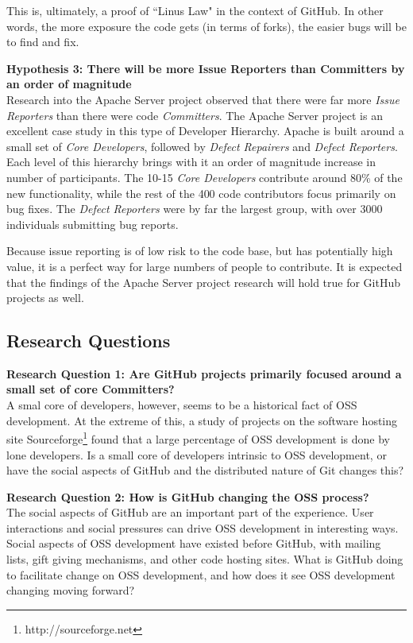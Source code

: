 \documentclass{proc}
\begin{document}
This is, ultimately, a proof of ``Linus Law"\cite{raymond1999cathedral} in the context of GitHub. In other words, the more exposure the code gets (in terms of forks), the easier bugs will be to find and fix.

\noindent \textbf{Hypothesis 3: There will be more Issue Reporters than Committers by an order of magnitude}\\
Research into the Apache Server project observed that there were far more \emph{Issue Reporters} than there were code \emph{Committers}\cite{mockus2000case}. The Apache Server project is an excellent case study in this type of Developer Hierarchy. Apache is built around a small set of {\it Core Developers}, followed by {\it Defect Repairers} and {\it Defect Reporters}. Each level of this hierarchy brings with it an order of magnitude increase in number of participants. The 10-15 {\it Core Developers} contribute around 80\% of the new functionality, while the rest of the 400 code contributors focus primarily on bug fixes. The {\it Defect Reporters} were by far the largest group, with over 3000 individuals submitting bug reports.

Because issue reporting is of low risk to the code base, but has potentially high value, it is a perfect way for large numbers of people to contribute. It is expected that the findings of the Apache Server project research will hold true for GitHub projects as well.

\subsection{Research Questions}

\noindent \textbf{Research Question 1: Are GitHub projects primarily focused around a small set of core Committers?}\\
A smal core of developers, however, seems to be a historical fact of OSS development\cite{mockus2000case,mockus2002two,krishnamurthy2002cave}. At the extreme of this, a study of projects on the software hosting site Sourceforge\footnote{http://sourceforge.net} found that a large percentage of OSS development is done by lone developers. Is a small core of developers intrinsic to OSS development, or have the social aspects of GitHub and the distributed nature of Git changes this?

\noindent \textbf{Research Question 2: How is GitHub changing the OSS process?}\\
The social aspects of GitHub are an important part of the experience\cite{dabbish2012social}. User interactions and social pressures can drive OSS development in interesting ways. Social aspects of OSS development have existed before GitHub, with mailing lists\cite{mockus2000case}, gift giving mechanisms\cite{bergquist2008power}, and other code hosting sites. What is GitHub doing to facilitate change on OSS development, and how does it see OSS development changing moving forward?
\end{document}
